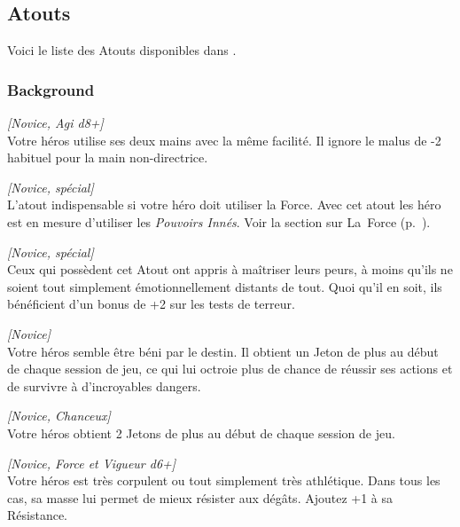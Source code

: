 \subsection{Atouts}

Voici le liste des Atouts disponibles dans \swfe.

\subsubsection{Background}
\begin{description}[align=left]
    \item [Ambidextre]
    	\emph{[Novice, Agi d8+]}\\
        Votre héros utilise ses deux mains avec la même facilité. Il ignore le malus de -2 habituel pour la main non-directrice.

    \item [Arcane (Force)]
    	\emph{[Novice, spécial]}\\
        L’atout indispensable si votre héro doit utiliser la Force. Avec cet atout les héro est en mesure d’utiliser les \emph{Pouvoirs Innés}. Voir la section sur La~Force (p.~\pageref{sec:force}).

    \item [Brave]
    	\emph{[Novice, spécial]}\\
        Ceux qui possèdent cet Atout ont appris à maîtriser leurs peurs, à moins qu’ils ne soient tout simplement émotionnellement distants de tout. Quoi qu’il en soit, ils bénéficient d’un bonus de +2 sur les tests de terreur.

    \item [Chanceux]
    	\emph{[Novice]}\\
        Votre héros semble être béni par le destin. Il obtient un Jeton de plus au début de chaque session de jeu, ce qui lui octroie plus de chance de réussir ses actions et de survivre à d’incroyables dangers.

    \item [Très Chanceux]
    	\emph{[Novice, Chanceux]}\\
        Votre héros obtient 2 Jetons de plus au début de chaque session de jeu.

    \item [Costaud]
    	\emph{[Novice, Force et Vigueur d6+]}\\
        Votre héros est très corpulent ou tout simplement très athlétique. Dans tous les cas, sa masse lui permet de mieux résister aux dégâts. Ajoutez +1 à sa Résistance.


\end{description}
